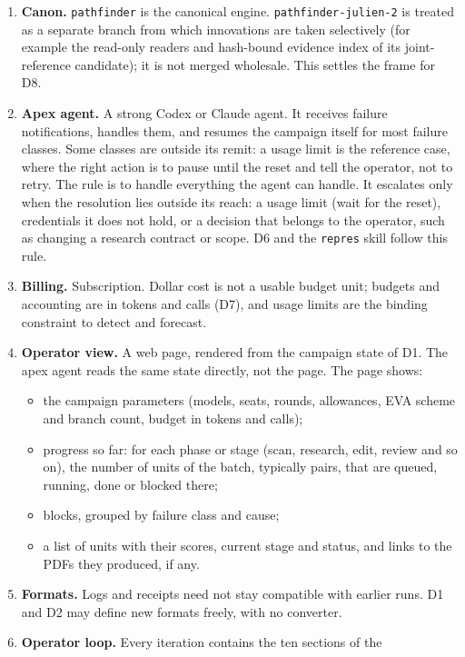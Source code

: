 \documentclass[11pt,a4paper]{article}
\begin{document}
\begin{enumerate}
\item \textbf{Canon.} \texttt{pathfinder} is the canonical engine.
  \texttt{pathfinder-julien-2} is treated as a separate branch from which
  innovations are taken selectively (for example the read-only readers and
  hash-bound evidence index of its joint-reference candidate); it is not merged
  wholesale. This settles the frame for D8.
\item \textbf{Apex agent.} A strong Codex or Claude agent. It receives failure
  notifications, handles them, and resumes the campaign itself for most failure
  classes. Some classes are outside its remit: a usage limit is the reference
  case, where the right action is to pause until the reset and tell the
  operator, not to retry. The rule is to handle everything the agent can
  handle. It escalates only when the resolution lies outside its reach: a usage
  limit (wait for the reset), credentials it does not hold, or a decision that
  belongs to the operator, such as changing a research contract or scope. D6 and
  the \texttt{repres} skill follow this rule.
\item \textbf{Billing.} Subscription. Dollar cost is not a usable budget unit;
  budgets and accounting are in tokens and calls (D7), and usage limits are the
  binding constraint to detect and forecast.
\item \textbf{Operator view.} A web page, rendered from the campaign state of
  D1. The apex agent reads the same state directly, not the page. The page shows:
  \begin{itemize}[nosep]
  \item the campaign parameters (models, seats, rounds, allowances, EVA scheme and
    branch count, budget in tokens and calls);
  \item progress so far: for each phase or stage (scan, research, edit, review and
    so on), the number of units of the batch, typically pairs, that are queued,
    running, done or blocked there;
  \item blocks, grouped by failure class and cause;
  \item a list of units with their scores, current stage and status, and links to
    the PDFs they produced, if any.
  \end{itemize}
\item \textbf{Formats.} Logs and receipts need not stay compatible with earlier
  runs. D1 and D2 may define new formats freely, with no converter.
\item \textbf{Operator loop.} Every iteration contains the ten sections of the

\end{enumerate}
\end{document}
